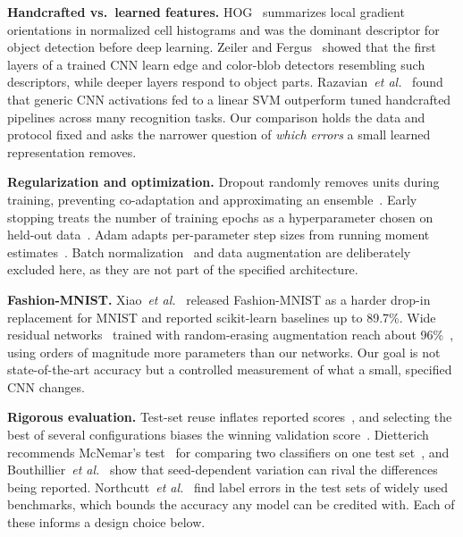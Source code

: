 \documentclass[conference]{IEEEtran}
\begin{document}
\textbf{Handcrafted vs.\ learned features.} HOG~\cite{dalal2005histograms} summarizes local gradient orientations in
normalized cell histograms and was the dominant descriptor for object detection before deep learning. Zeiler and
Fergus~\cite{zeiler2014visualizing} showed that the first layers of a trained CNN learn edge and color-blob detectors
resembling such descriptors, while deeper layers respond to object parts. Razavian~\emph{et al.}~\cite{razavian2014cnn}
found that generic CNN activations fed to a linear SVM outperform tuned handcrafted pipelines across many recognition
tasks. Our comparison holds the data and protocol fixed and asks the narrower question of \emph{which errors} a small
learned representation removes.

\textbf{Regularization and optimization.} Dropout randomly removes units during training, preventing co-adaptation and
approximating an ensemble~\cite{srivastava2014dropout}. Early stopping treats the number of training epochs as a
hyperparameter chosen on held-out data~\cite{prechelt1998early}. Adam adapts per-parameter step sizes from running moment
estimates~\cite{kingma2015adam}. Batch normalization~\cite{ioffe2015batch} and data augmentation are deliberately
excluded here, as they are not part of the specified architecture.

\textbf{Fashion-MNIST.} Xiao~\emph{et al.}~\cite{xiao2017fashion} released Fashion-MNIST as a harder drop-in replacement
for MNIST and reported scikit-learn baselines up to 89.7\%. Wide residual networks~\cite{zagoruyko2016wide} trained with
random-erasing augmentation reach about 96\%~\cite{zhong2020random}, using orders of magnitude more parameters than our
networks. Our goal is not state-of-the-art accuracy but a controlled measurement of what a small, specified CNN changes.

\textbf{Rigorous evaluation.} Test-set reuse inflates reported scores~\cite{kaufman2012leakage}, and selecting the best of
several configurations biases the winning validation score~\cite{cawley2010overfitting}. Dietterich recommends
McNemar's test~\cite{mcnemar1947note} for comparing two classifiers on one test set~\cite{dietterich1998approximate}, and
Bouthillier~\emph{et al.}~\cite{bouthillier2021accounting} show that seed-dependent variation can rival the differences
being reported. Northcutt~\emph{et al.}~\cite{northcutt2021pervasive} find label errors in the test sets of widely used
benchmarks, which bounds the accuracy any model can be credited with. Each of these informs a design choice below.
\end{document}
